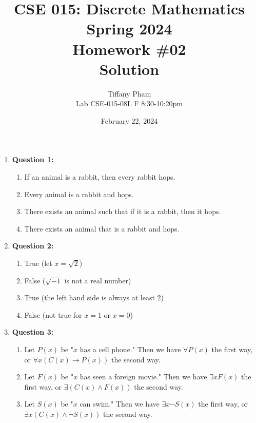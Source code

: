 \documentclass[11pt]{article}
\begin{document}
\author{Tiffany Pham\\
Lab CSE-015-08L F 8:30-10:20pm}
\title{CSE 015: Discrete Mathematics\\
Spring 2024\\
Homework \#02\\
Solution}
\date{February 22, 2024}
\maketitle
\begin{enumerate}
    \item \textbf{Question 1:}
    \begin{enumerate}[label=(\alph*)]
        \item If an animal is a rabbit, then every rabbit hops.
        \item Every animal is a rabbit and hops.
        \item There exists an animal such that if it is a rabbit, then it hops.
        \item There exists an animal that is a rabbit and hops.
    \end{enumerate}
    \item \textbf{Question 2:}
    \begin{enumerate}[label=(\alph*)]
        \item True (let $x=\sqrt{2}$)
        \item False ($\sqrt{-1}$ is not a real number)
        \item True (the left hand side is always at least 2)
        \item False (not true for $x=1$ or $x=0$)
    \end{enumerate}
    \item \textbf{Question 3:}
    \begin{enumerate}[label=(\alph*)]
        \item Let $P(x)$ be "$x$ has a cell phone." Then we have $\forall P(x)$ the first way, or $\forall x(C(x)\rightarrow P(x))$ the second way.
        \item Let $F(x)$ be "$x$ has seen a foreign movie." Then we have $\exists xF(x)$ the first way, or $\exists(C(x)\land F(x))$ the second way.
        \item Let $S(x)$ be "$x$ can swim." Then we have $\exists x\lnot S(x)$ the first way, or $\exists x(C(x)\land\lnot S(x))$ the second way.

\end{enumerate}
\end{enumerate}
\end{document}
